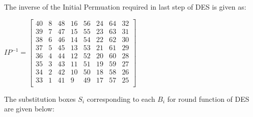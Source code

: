 \documentclass[11pt]{article}
\begin{document}
The inverse of the Initial Permuation required in last step of DES is given as:
\begin{center}
    $IP^{-1} = 
    \begin{bmatrix}
        40 & 8 & 48 & 16 & 56 & 24 & 64 & 32\\
        39 & 7 & 47 & 15 & 55 & 23 & 63 & 31\\
        38 & 6 & 46 & 14 & 54 & 22 & 62 & 30\\
        37 & 5 & 45 & 13 & 53 & 21 & 61 & 29\\
        36 & 4 & 44 & 12 & 52 & 20 & 60 & 28\\
        35 & 3 & 43 & 11 & 51 & 19 & 59 & 27\\
        34 & 2 & 42 & 10 & 50 & 18 & 58 & 26\\
        33 & 1 & 41 & 9 & 49 & 17 & 57 & 25\\
    \end{bmatrix}$
\end{center}

The substitution boxes $S_i$ corresponding to each $B_i$ for round function of DES are given below:
\end{document}
